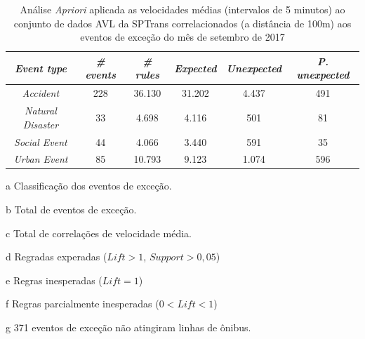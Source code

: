 \documentclass[
	12pt,				%
	oneside,			%
	a4paper,			%
	english,			%
	brazil				%
	]{abntex2ppgsi}
\begin{document}
{{\begin{apendicesenv}
\begin{table}[!htb]
\centering
\begin{threeparttable}
\caption {Análise \textit{Apriori} aplicada as velocidades médias (intervalos de 5 minutos) ao conjunto de dados AVL da SPTrans correlacionados (a distância de 100m) aos eventos de exceção do mês de setembro de 2017}
\label {tab:aprioriFull}
\begin{tabular}{c|c|c|c|c|c}
\hline
\textbf{\textit{Event type}}\tnote{a} & \textbf{\textit{\# events}}\tnote{b} & \textit{\textbf{\# rules}}\tnote{c} & \textbf{\textit{Expected}}\tnote{d} & \textbf{\textit{Unexpected}}\tnote{e} & \textbf{\textit{P. unexpected}}\tnote{f}   \\
\hline
\textit{Accident} & 228 & 36.130 & 31.202 & 4.437 & 491 \\
\textit{Natural Disaster} & 33 & 4.698 & 4.116 & 501 & 81 \\
\textit{Social Event} & 44 & 4.066 & 3.440 & 591 & 35 \\
\textit{Urban Event} & 85 & 10.793 & 9.123 & 1.074 & 596 \\
\hline
\end{tabular}
\begin{tablenotes}
            \item[a] Classificação dos eventos de exceção.
            \item[b] Total de eventos de exceção.
            \item[c] Total de correlações de velocidade média.
            \item[d] Regradas experadas ($Lift > 1$, $Support > 0,05$)
            \item[e] Regras inesperadas ($Lift = 1$)
            \item[f] Regras parcialmente inesperadas ($0 < Lift < 1$)
            \item[g] 371 eventos de exceção não atingiram linhas de ônibus.
        \end{tablenotes}
\end{threeparttable}
\end{table}


\end{apendicesenv}}}
\end{document}
